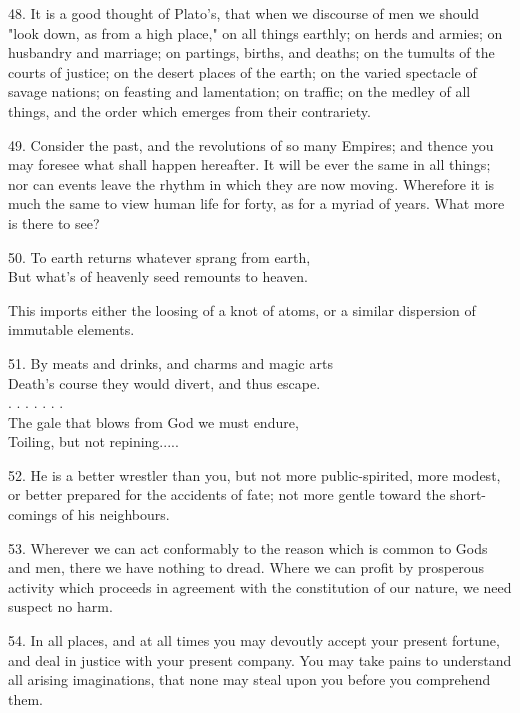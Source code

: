 \documentclass{book}
\begin{document}
48. It is a good thought of Plato's, that when we discourse of men we
should "look down, as from a high place," on all things earthly; on
herds and armies; on husbandry and marriage; on partings, births, and
deaths; on the tumults of the courts of justice; on the desert places
of the earth; on the varied spectacle of savage nations; on feasting
and lamentation; on traffic; on the medley of all things, and the
order which emerges from their contrariety.

49. Consider the past, and the revolutions of so many Empires; and
thence you may foresee what shall happen hereafter. It will be ever
the same in all things; nor can events leave the rhythm in which they
are now moving. Wherefore it is much the same to view human life for
forty, as for a myriad of years. What more is there to see?

50. To earth returns whatever sprang from earth, \\
    But what's of heavenly seed remounts to heaven.

This imports either the loosing of a knot of atoms, or a similar
dispersion of immutable elements.

51. By meats and drinks, and charms and magic arts \\
    Death's course they would divert, and thus escape. \\
    .  .  .  .  .  .  . \\
    The gale that blows from God we must endure, \\
    Toiling, but not repining.....

52. He is a better wrestler than you, but not more public-spirited,
more modest, or better prepared for the accidents of fate; not more
gentle toward the short-comings of his neighbours.

53. Wherever we can act conformably to the reason which is common to
Gods and men, there we have nothing to dread. Where we can profit by
prosperous activity which proceeds in agreement with the constitution
of our nature, we need suspect no harm.

54. In all places, and at all times you may devoutly accept your
present fortune, and deal in justice with your present company. You
may take pains to understand all arising imaginations, that none may
steal upon you before you comprehend them.
\end{document}

